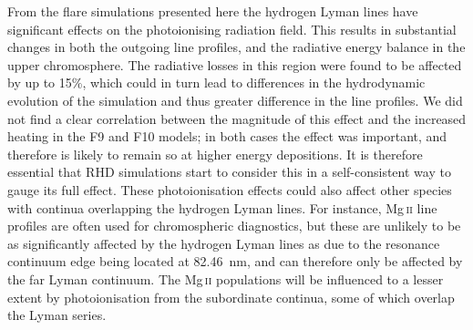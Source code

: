 From the flare simulations presented here the hydrogen Lyman lines have significant effects on the \Caii{} photoionising radiation field.
This results in substantial changes in both the outgoing \CaLine{} line profiles, and the radiative energy balance in the upper chromosphere.
The radiative losses in this region were found to be affected by up to 15\%, which could in turn lead to differences in the hydrodynamic evolution of the simulation and thus greater difference in the line profiles.
We did not find a clear correlation between the magnitude of this effect and the increased heating in the F9 and F10 models; in both cases the effect was important, and therefore is likely to remain so at higher energy depositions.
It is therefore essential that RHD simulations start to consider this in a self-consistent way to gauge its full effect.
These photoionisation effects could also affect other species with continua overlapping the hydrogen Lyman lines.
For instance, Mg\,\textsc{ii} line profiles are often used for chromospheric diagnostics, but these are unlikely to be as significantly affected by the hydrogen Lyman lines as \Caii{} due to the resonance continuum edge being located at \SI{82.46}{\nano\metre}, and can therefore only be affected by the far Lyman continuum.
The Mg\,\textsc{ii} populations will be influenced to a lesser extent by photoionisation from the subordinate continua, some of which overlap the Lyman series.

